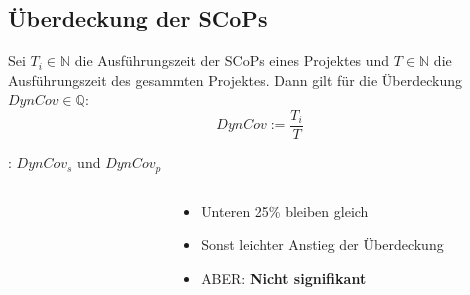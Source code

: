 \documentclass[aspectratio=169, xcolor=dvipsnames]{beamer}
\begin{document}
\subsection{Überdeckung der SCoPs}
\begin{frame}{\subsecname}
    Sei \(T_i\in\mathbb{N}\) die Ausführungszeit der SCoPs eines Projektes und \(T\in\mathbb{N}\) die Ausführungszeit des gesammten Projektes. Dann gilt für die Überdeckung \(DynCov\in\mathbb{Q}\):
    \Huge{\[DynCov := \frac{T_i}{T}\]}
\end{frame}
\begin{frame}{\subsecname: \(DynCov_s\) und \(DynCov_p\)}
    \vspace{-1cm}
    \begin{columns}
        \begin{column}{5cm}
            \begin{figure}[!h]
                
            \end{figure}
        \end{column}
        \begin{column}{5cm}
            \begin{itemize}
                \item Unteren 25\% bleiben gleich
                \item Sonst leichter Anstieg der Überdeckung
                \item ABER: \textbf{Nicht signifikant}
            \end{itemize}
        \end{column}
    \end{columns}
\end{frame}
\end{document}
